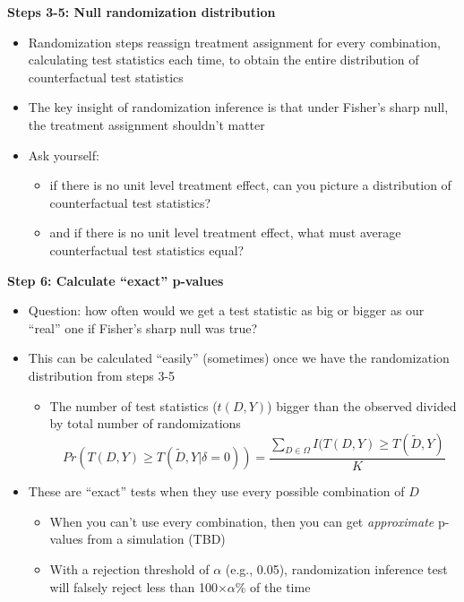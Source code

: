 \documentclass[notes=show]{beamer}
\begin{document}
\begin{frame}[plain]
\begin{center}
\textbf{Steps 3-5: Null randomization distribution}
\end{center}

\begin{itemize}
\item Randomization steps reassign treatment assignment for every combination, calculating test statistics each time, to obtain the entire distribution of counterfactual test statistics
\item The key insight of randomization inference is that under Fisher's sharp null, the treatment assignment shouldn't matter
\item Ask yourself: 
	\begin{itemize}
	\item if there is no unit level treatment effect, can you picture a distribution of counterfactual test statistics?
	\item and if there is no unit level treatment effect, what must average counterfactual test statistics equal?
	\end{itemize}
\end{itemize}

\end{frame}

\begin{frame}[plain]
\begin{center}
\textbf{Step 6: Calculate ``exact'' p-values}
\end{center}

\begin{itemize}
\item Question: how often would we get a test statistic as big or bigger as our ``real'' one if Fisher's sharp null was true?
\item This can be calculated ``easily'' (sometimes) once we have the randomization distribution from steps 3-5
	\begin{itemize}
	\item The number of test statistics ($t(D,Y)$) bigger than the observed divided by total number of randomizations $$Pr(T(D,Y) \geq T(\tilde{D},Y | \delta = 0)) = \frac{ \sum_{D \in \Omega} I(T(D,Y) \geq T(\tilde{D},Y)}{K}$$
	\end{itemize}
\item These are ``exact'' tests when they use every possible combination of $D$ 
	\begin{itemize}
	\item When you can't use every combination, then you can get \emph{approximate} p-values from a simulation (TBD)
	\item With a rejection threshold of $\alpha$ (e.g., 0.05), randomization inference test will falsely reject less than 100$\times \alpha$\% of the time
	\end{itemize}
\end{itemize}
\end{frame}
\end{document}
